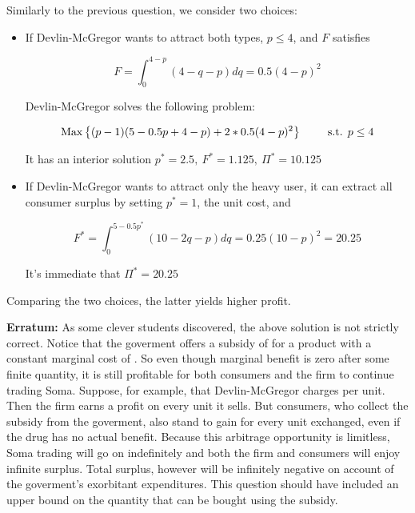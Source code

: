 \documentclass{article}
\DeclareMathOperator*{\Max}{Max}
\newcommand{\st}{\hbox{ s.t. }}
\newenvironment{solution}{\color{red}}{\color{black}}
\begin{document}
\begin{solution}
\begin{enumerate}
Similarly to the previous question, we consider two choices:

\begin{itemize}
\item If Devlin-McGregor wants to attract both types, $p\leq 4$, and $F$ satisfies

\[ F=\int_0^{4-p}(4-q-p)dq=0.5(4-p)^2 \]

Devlin-McGregor solves the following problem:

\[ \Max \left\{ (p-1)(5-0.5p+4-p)+2*0.5(4-p)^2 \right\} \qquad \st p\leq 4 \]

It has an interior solution $p^*=2.5,\ F^*=1.125,\ \Pi^*=10.125$

\item If Devlin-McGregor wants to attract only the heavy user, it can extract all consumer surplus by setting $p^*=1$, the unit cost, and 

\[ F^*=\int_0^{5-0.5p^*}(10-2q-p)dq=0.25(10-p)^2=20.25 \]

It's immediate that $\Pi^*=20.25$
\end{itemize}

Comparing the two choices, the latter yields higher profit.

{\bf Erratum:} As some clever students discovered, the above solution is not strictly correct. Notice that the goverment offers a subsidy of  for a product with a constant marginal cost of . So even though marginal benefit is zero after some finite quantity, it is still profitable for both consumers and the firm to continue trading Soma. Suppose, for example, that Devlin-McGregor charges  per unit. Then the firm earns a  profit on every unit it sells. But consumers, who collect the subsidy from the goverment, also stand to gain  for every unit exchanged, even if the drug has no actual benefit. Because this arbitrage opportunity is limitless, Soma trading will go on indefinitely and both the firm and consumers will enjoy infinite surplus. Total surplus, however will be infinitely negative on account of the goverment's exorbitant expenditures. This question should have included an  upper bound on the quantity that can be bought using the subsidy. 
\end{enumerate}
\end{solution}
\end{document}
